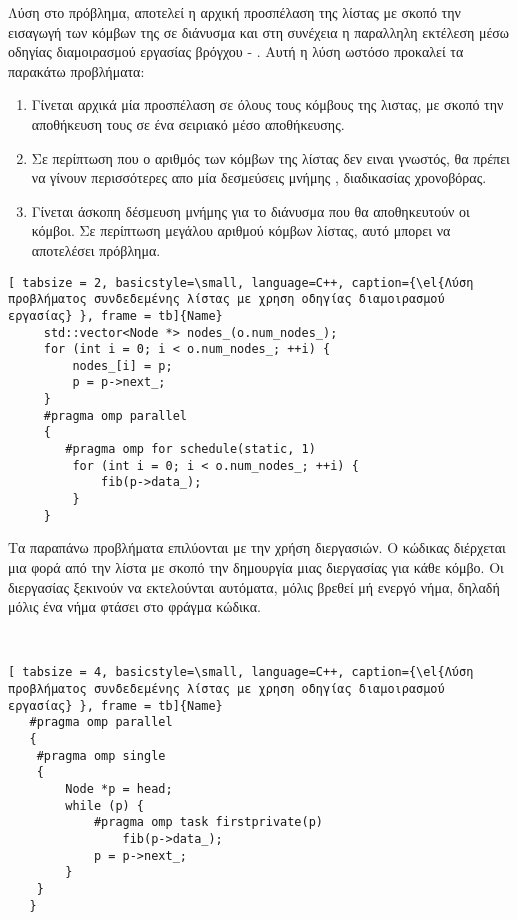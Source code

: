 Λύση στο πρόβλημα, αποτελεί η αρχική προσπέλαση της λίστας με σκοπό την εισαγωγή των κόμβων της σε διάνυσμα και στη συνέχεια η παραλληλη εκτέλεση μέσω οδηγίας διαμοιρασμού εργασίας βρόγχου - \emph{}.
Αυτή η λύση ωστόσο προκαλεί τα παρακάτω προβλήματα:
\begin{enumerate}
\item Γίνεται αρχικά μία προσπέλαση σε όλους τους κόμβους της λιστας, με σκοπό την αποθήκευση τους σε ένα σειριακό μέσο αποθήκευσης.
\item Σε περίπτωση που ο αριθμός των κόμβων της λίστας δεν ειναι γνωστός, θα πρέπει να γίνουν περισσότερες απο μία δεσμεύσεις μνήμης \emph{}, διαδικασίας χρονοβόρας.
\item Γίνεται άσκοπη δέσμευση μνήμης για το διάνυσμα που θα αποθηκευτούν οι κόμβοι. Σε περίπτωση μεγάλου αριθμού κόμβων λίστας, αυτό μπορει να αποτελέσει πρόβλημα.

\end{enumerate}
\clearpage
{}
\begin{lstlisting}[ tabsize = 2, basicstyle=\small, language=C++, caption={\el{Λύση προβλήματος συνδεδεμένης λίστας με χρηση οδηγίας διαμοιρασμού εργασίας} }, frame = tb]{Name}
	 std::vector<Node *> nodes_(o.num_nodes_);  
     for (int i = 0; i < o.num_nodes_; ++i) {
         nodes_[i] = p;
         p = p->next_;
     }
	 #pragma omp parallel
     {
 		#pragma omp for schedule(static, 1) 
         for (int i = 0; i < o.num_nodes_; ++i) {
             fib(p->data_);
         }
     }
\end{lstlisting}

Τα παραπάνω προβλήματα επιλύονται με την χρήση διεργασιών. Ο κώδικας διέρχεται μια φορά από την λίστα με σκοπό την δημουργία μιας διεργασίας για κάθε κόμβο. Οι διεργασίας ξεκινούν να εκτελούνται αυτόματα, μόλις βρεθεί μή ενεργό νήμα, δηλαδή μόλις ένα νήμα φτάσει στο φράγμα κώδικα.

\ \\
\begin{lstlisting}[ tabsize = 4, basicstyle=\small, language=C++, caption={\el{Λύση προβλήματος συνδεδεμένης λίστας με χρηση οδηγίας διαμοιρασμού εργασίας} }, frame = tb]{Name}
   #pragma omp parallel
   {
   	#pragma omp single
   	{
   		Node *p = head;
   		while (p) {
   			#pragma omp task firstprivate(p)
   				fib(p->data_);
   			p = p->next_;
   		}
   	}
   }

\end{lstlisting}

